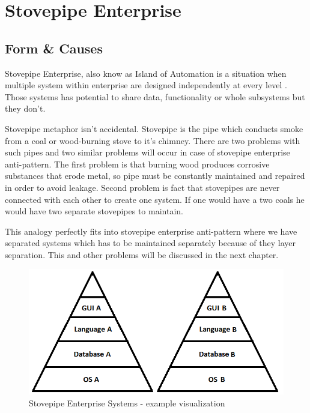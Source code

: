 \section{Stovepipe Enterprise}

\subsection{Form \& Causes}

Stovepipe Enterprise, also know as Island of Automation \cite{c2com} is a situation when multiple system within enterprise are designed independently at every level \cite{Crisis}. Those systems has potential to share data, functionality or whole subsystems but they don't.

Stovepipe metaphor isn't accidental. Stovepipe is the pipe which conducts smoke from a coal or wood-burning stove to it's chimney. There are two problems with such pipes and two similar problems will occur in case of stovepipe enterprise anti-pattern. The first problem is that burning wood produces corrosive substances that erode metal, so pipe must be constantly maintained and repaired in order to avoid leakage. Second problem is fact that stovepipes are never connected with each other to create one system. If one would have a two coals he would have two separate stovepipes to maintain.

This analogy perfectly fits into stovepipe enterprise anti-pattern where we have separated systems which has to be maintained separately because of they layer separation. This and other problems will be discussed in the next chapter.

\begin{figure}[!h]
    \centering
    \includegraphics[scale=0.7]{Images/Systems.png}
    \caption[Stovepipe Enterprise Systems]{Stovepipe Enterprise Systems - example visualization}
    \label{fig:Systems}
\end{figure}

